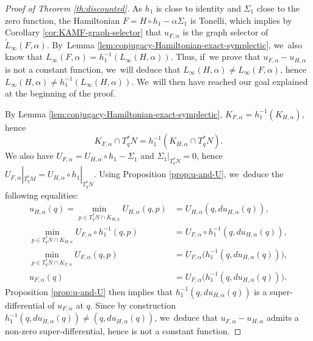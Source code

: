 \documentclass[JEP,XML,SOM,Unicode,NoFloatCountersInSection,published]{cedram}
\theoremstyle{definition}
\begin{document}
\begin{proof}[Proof of Theorem \ref{th:discounted}]
As $h_1$ is close to identity and $\Sigma_1$ close to the zero function, the Hamiltonian $F=H\circ h_1-\alpha \Sigma_1$ is Tonelli, which implies by Corollary \ref{cor:KAMF-graph-selector} that $u_{F,\alpha}$ is the graph selector of $\tilde L_\infty(F, \alpha)$. By~Lemma \ref{lem:conjugacy-Hamiltonian-exact-symplectic}, we~also know that $L_\infty(F, \alpha)=h_1^{-1}(L_\infty(H, \alpha))$. Thus, if~we prove that $u_{F, \alpha}-u_{H, \alpha}$ is not a constant function, we~will deduce that $L_\infty(H, \alpha)\neq L_\infty(F, \alpha)$, hence $L_\infty(H, \alpha)\neq h_1^{-1}(L_\infty(H, \alpha))$. We~will then have reached our goal explained at the beginning of the proof.

By Lemma \ref{lem:conjugacy-Hamiltonian-exact-symplectic}, $K_{F, \alpha}=h_1^{-1}(K_{H, \alpha})$, hence
\[
K_{F, \alpha}\cap T_q^*N=h_1^{-1}(K_{H, \alpha}\cap T^*_qN).
\]
We also have $U_{F, \alpha} = U_{H, \alpha}\circ h_1-\Sigma_1$ and $\Sigma_1|_{T^*_qN}=0$, hence $U_{F, \alpha}|_{T^*_qM}=U_{H, \alpha}\circ h_{1}|_{T_q^*N}$. Using Proposition \ref{prop:u-and-U}, we~deduce the following equalities:
\[
\begin{split}
u_{H, \alpha}(q)=\min_{p\in T^*_qN\cap K_{H, \alpha}}U_{H, \alpha}(q,p)&=U_{H, \alpha}(q, du_{H, \alpha}(q)),\\
\min_{p\in T^*_qN\cap K_{H, \alpha}}U_{F, \alpha}\circ h_1^{-1}(q,p)&=U_{F, \alpha}\circ h_1^{-1}(q, du_{H, \alpha}(q)),\\
\min_{p\in T^*_qN\cap K_{F, \alpha}}U_{F, \alpha}(q,p)&=U_{F, \alpha}\bigl(h_1^{-1}(q, du_{H, \alpha}(q))\bigr),\\
u_{F, \alpha}(q)&=U_{F, \alpha}\bigl(h_1^{-1}(q, du_{H, \alpha}(q))\bigr).
\end{split}
\]
Proposition \ref{prop:u-and-U} then implies that $h_1^{-1}(q, du_{H, \alpha}(q))$ is a super-differential of $u_{F, \alpha}$ at $q$. Since by construction $h_1^{-1}(q, du_{H, \alpha}(q))\neq (q, du_{H, \alpha}(q))$, we~deduce that $u_{F, \alpha}-u_{H, \alpha}$ admits a non-zero super-differential, hence is not a constant function.
\end{proof}
\end{document}
